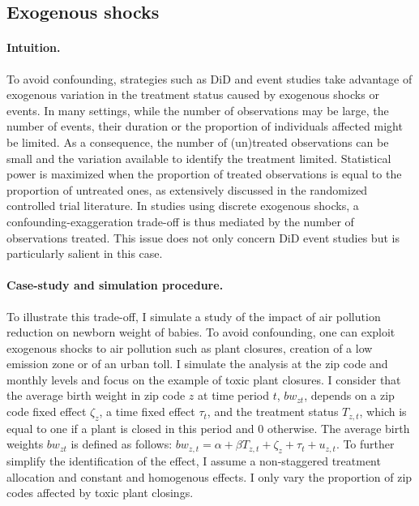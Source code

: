 \documentclass[usletter, 12pt]{article}
\begin{document}




		\subsection{Exogenous shocks}\label{sim_shocks}
    
        			\paragraph{Intuition.}  To avoid confounding, strategies such as DiD and event studies take advantage of exogenous variation in the treatment status caused by exogenous shocks or events. In many settings, while the number of observations may be large, the number of events, their duration or the proportion of individuals affected might be limited. As a consequence, the number of (un)treated observations can be small and the variation available to identify the treatment limited. Statistical power is maximized when the proportion of treated observations is equal to the proportion of untreated ones, as extensively discussed in the randomized controlled trial literature. In studies using discrete exogenous shocks, a confounding-exaggeration trade-off is thus mediated by the number of observations treated. This issue does not only concern DiD event studies but is particularly salient in this case. 
			
			\paragraph{Case-study and simulation procedure.} %
			To illustrate this trade-off, I simulate a study of the impact of air pollution reduction on newborn weight of babies. To avoid confounding, one can exploit exogenous shocks to air pollution such as plant closures, creation of a low emission zone or of an urban toll. I simulate the analysis at the zip code and monthly levels and focus on the example of toxic plant closures. I consider that the average birth weight in zip code $z$ at time period $t$, $bw_{zt}$, depends on a zip code fixed effect $\zeta_z$, a time fixed effect $\tau_t$, and the treatment status $T_{z,t}$, which is equal to one if a plant is closed in this period and 0 otherwise. The average birth weights $bw_{zt}$ is defined as follows: $bw_{z,t} = \alpha + \beta T_{z, t} + \zeta_z + \tau_t + u_{z,t}$. To further simplify the identification of the effect, I assume a non-staggered treatment allocation and constant and homogenous effects. I only vary the proportion of zip codes affected by toxic plant closings.
\end{document}
